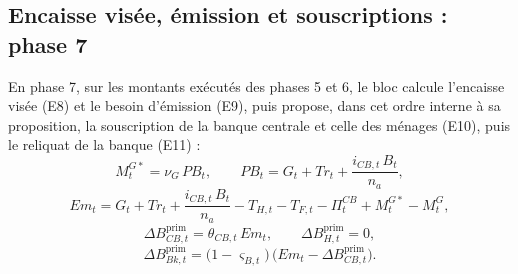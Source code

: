 \documentclass[11pt,a4paper]{article}
\begin{document}
\subsection{Encaisse visée, émission et souscriptions : phase 7}
\label{sec:finances_publiques-emission}
\begin{proposee}
En phase 7, sur les montants exécutés des phases 5 et 6, le bloc calcule l'encaisse visée (E8) et le besoin d'émission (E9), puis propose, dans cet ordre interne à sa proposition, la souscription de la banque centrale et celle des ménages (E10), puis le reliquat de la banque (E11) :
\begin{equation*}
M^{G*}_t = \nu_G\,\mathit{PB}_t, \qquad \mathit{PB}_t = G_t + \mathit{Tr}_t + \frac{i_{\mathit{CB},t}\,B_t}{n_a} , \tag{E8}
\end{equation*}
\begin{equation*}
\mathit{Em}_t = G_t + \mathit{Tr}_t + \frac{i_{\mathit{CB},t}\,B_t}{n_a} - T_{H,t} - T_{F,t} - \Pi^{\mathit{CB}}_t + M^{G*}_t - M^G_t , \tag{E9}
\end{equation*}
\begin{equation*}
\Delta B^{\mathrm{prim}}_{\mathit{CB},t} = \theta_{\mathit{CB},t}\,\mathit{Em}_t, \qquad \Delta B^{\mathrm{prim}}_{H,t} = 0 , \tag{E10}
\end{equation*}
\begin{equation*}
\Delta B^{\mathrm{prim}}_{\mathit{Bk},t} = \bigl(1 - \varsigma_{B,t}\bigr)\,\bigl(\mathit{Em}_t - \Delta B^{\mathrm{prim}}_{\mathit{CB},t}\bigr) . \tag{E11}
\end{equation*}


\end{proposee}
\end{document}
